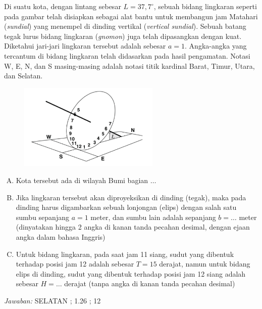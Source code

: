 \documentclass[11pt,fleqn]{exam}
\begin{document}
\begin{questions}
\vspace{0.5cm}
\question Di suatu kota, dengan lintang sebesar $L = 37,7^{\circ}$, sebuah bidang lingkaran seperti pada gambar telah disiapkan sebagai alat bantu untuk membangun jam Matahari (\textit{sundial}) yang menempel di dinding vertikal (\textit{vertical sundial}). Sebuah batang tegak lurus bidang lingkaran (\textit{gnomon}) juga telah dipasangkan dengan kuat. Diketahui jari-jari lingkaran tersebut adalah sebesar $a=1$. Angka-angka yang tercantum di bidang lingkaran telah didasarkan pada hasil pengamatan. Notasi W, E, N, dan S masing-masing adalah notasi titik kardinal Barat, Timur, Utara, dan Selatan.
\begin{figure}[H]
\centering
\includegraphics[width=0.6\textwidth]{osp2022_27.png}
\label{fig:osp2022_27}
\end{figure}
\begin{enumerate}[A.]
    \item Kota tersebut ada di wilayah Bumi bagian $\ldots$
    \item Jika lingkaran tersebut akan diproyeksikan di dinding (tegak), maka pada dinding harus digambarkan sebuah lonjongan (elips) dengan salah satu sumbu sepanjang $a=1$ meter, dan sumbu lain adalah sepanjang $b = \ldots $ meter (dinyatakan hingga 2 angka di kanan tanda pecahan desimal, dengan ejaan angka dalam bahasa Inggris)
    \item Untuk bidang lingkaran, pada saat jam 11 siang, sudut yang dibentuk terhadap posisi jam 12 adalah sebesar $T=15$ derajat, namun untuk bidang elips di dinding, sudut yang dibentuk terhadap posisi jam 12 siang adalah sebesar $H=\ldots$ derajat (tanpa angka di kanan tanda pecahan desimal)
\end{enumerate}

\bigskip
\textit{Jawaban: } SELATAN ; 1.26 ; 12


\end{questions}
\end{document}
